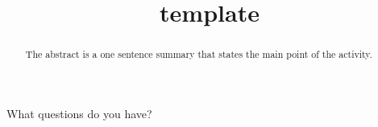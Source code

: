 \documentclass{ximera}
\title{template}
\begin{document}
\begin{abstract}
  The abstract is a one sentence summary that states the main point of the activity.
\end{abstract}

\maketitle

What questions do you have?
\begin{free-response}
\end{free-response}
\end{document}
